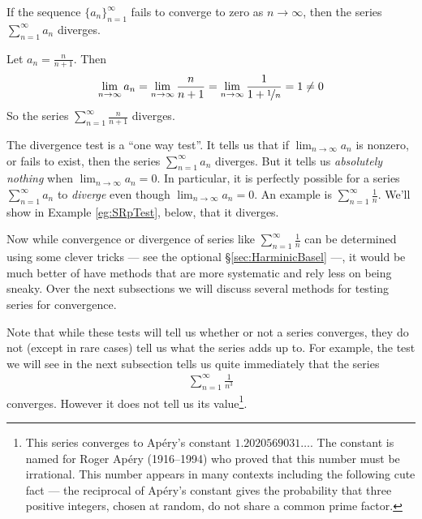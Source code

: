 \begin{theorem}\label{thm:SRdivergenceTest}
If the sequence $\big\{a_n\big\}_{n=1}^\infty$ fails to converge to zero
as $n\rightarrow\infty$, then the series $\sum_{n=1}^\infty a_n$ diverges.
\end{theorem}

\begin{eg}\label{eg:SRdivTest}
Let $a_n=\frac{n}{n+1}$. Then
\begin{equation*}
\lim_{n\rightarrow\infty} a_n
=\lim_{n\rightarrow\infty}\frac{n}{n+1}
=\lim_{n\rightarrow\infty}\frac{1}{1+\nicefrac{1}{n}}
=1\ne 0
\end{equation*}
So the series $\sum_{n=1}^\infty \frac{n}{n+1}$ diverges.

\end{eg}

\begin{warning}\label{wrn:SRdivTest}
The divergence test is a ``one way test''. It tells us that if
$\lim_{n\rightarrow\infty}a_n$ is nonzero, or fails to exist, then
the series $\sum_{n=1}^\infty a_n$ diverges. But it tells us \emph{absolutely
nothing} when $\lim_{n\rightarrow\infty}a_n=0$. In particular, it is perfectly
possible for a series $\sum_{n=1}^\infty a_n$ to \emph{diverge} even
though  $\lim_{n\rightarrow\infty}a_n=0$.
An example is $\sum_{n=1}^\infty \frac{1}{n}$. We'll show in Example
\ref{eg:SRpTest}, below, that it diverges.
\end{warning}


Now while convergence or divergence of series like
$\sum_{n=1}^\infty \frac{1}{n}$ can be determined using some
clever tricks --- see the optional \S\ref{sec:HarminicBasel} ---,
it would be much better of have methods that are more systematic and
rely less on being sneaky. Over the next subsections we will discuss
several methods for testing series for convergence.


Note that while these tests will tell us whether or not a series
converges, they do not (except in rare cases) tell us what the
series adds up to. For example, the test we will
see in the next subsection tells us quite immediately that the series
\begin{align*}
  \sum_{n=1}^\infty \frac{1}{n^3}
\end{align*}
converges. However it does not tell us its value\footnote{This series
converges to Ap\'ery's constant $1.2020569031\dots$. The constant is
named for Roger Ap\'ery (1916--1994) who proved that this number must be irrational. This number appears in many contexts including the following
cute fact --- the reciprocal of Ap\'ery's constant gives the probability
that three positive integers, chosen at random, do not share
a common prime factor.}.


